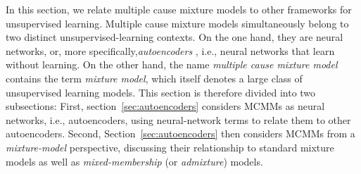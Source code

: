 In this section, we relate multiple cause mixture models to other frameworks for unsupervised learning. 
Multiple cause mixture models simultaneously belong to two distinct unsupervised-learning contexts. 
On the one hand, they are neural networks, or, more specifically,\emph{autoencoders} \citep{dayan-and-zemel:95}, 
i.e., neural networks that learn without learning. On the other hand, the name 
\emph{multiple cause mixture model} 
contains the term \emph{mixture model}, which itself denotes a large class of unsupervised learning models. 
This section is therefore divided into two subsections: First, section~\ref{sec:autoencoders} considers MCMMs as neural networks, i.e., autoencoders, using neural-network terms to relate them to other autoencoders. Second, Section~\ref{sec:autoencoders} then considers MCMMs from a \emph{mixture-model} perspective, discussing their relationship to standard mixture models as well as \emph{mixed-membership} (or \emph{admixture}) models. 


